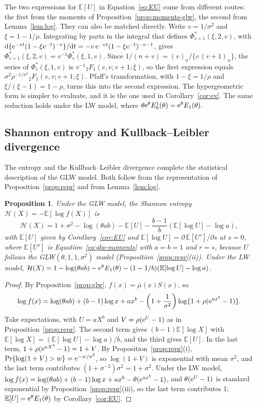 \documentclass[12pt]{article}
\newcommand{\E}{\mathbb{E}}       %
\newcommand{\e}{{\rm e}}         %
\newcommand{\dd}{{\rm d}}        %
\newtheorem{proposition}{Proposition}
\begin{document}
The two expressions for $\E[U]$ in Equation~\eqref{eq:EU} come from different routes: the first from the moments of Proposition~\ref{prop:moments-glw}, the second from Lemma~\ref{lem:log}. They can also be matched directly. Write $v=1/\sigma^2$ and $\xi=1-1/\rho$. Integrating by parts in the integral that defines $\Phi^\ast_{v+1}(\xi,2,v)$, with $\dd\{\e^{-vt}(1-\xi\e^{-t})^{-v}\}/\dd t=-v\,\e^{-vt}(1-\xi\e^{-t})^{-v-1}$, gives $\Phi^\ast_{v+1}(\xi,2,v)=v^{-1}\Phi^\ast_{v}(\xi,1,v)$. Since $1/(n+v)=(v)_n/\{v\,(v+1)_n\}$, the series of $\Phi^\ast_{v}(\xi,1,v)$ is $v^{-1}{}_2F_1(v,v;v+1;\xi)$, so the first expression equals $\sigma^2\rho^{-1/\sigma^2}{}_2F_1(v,v;v+1;\xi)$. Pfaff's transformation, with $1-\xi=1/\rho$ and $\xi/(\xi-1)=1-\rho$, turns this into the second expression. The hypergeometric form is simpler to evaluate, and it is the one used in Corollary~\ref{cor:ex}. The same reduction holds under the LW model, where $\theta\e^\theta E_0^1(\theta)=\e^\theta E_1(\theta)$.

\subsection{Shannon entropy and Kullback--Leibler divergence}\label{app:entropy}

The entropy and the Kullback--Leibler divergence complete the statistical description of the GLW model. Both follow from the representation of Proposition~\ref{prop:repr} and from Lemma~\ref{lem:log}.

\begin{proposition}\label{prop:entropy}
Under the GLW model, the Shannon entropy $\mathcal{H}(X)=-\E[\log f(X)]$ is
\[
\mathcal{H}(X)=1+\sigma^2-\log(\theta ab)-\E[U]-\frac{b-1}{b}\left(\E[\log U]-\log a\right),
\]
with $\E[U]$ given by Corollary~\ref{cor:EU} and $\E[\log U]=\partial\,\E[U^s]/\partial s$ at $s=0$, where $\E[U^s]$ is Equation~\eqref{eq:glw-moments} with $a=b=1$ and $r=s$, because $U$ follows the GLW$(\theta,1,1,\sigma^2)$ model (Proposition~\ref{prop:repr}(ii)). Under the LW model, $\mathcal{H}(X)=1-\log(\theta ab)-\e^\theta E_1(\theta)-(1-1/b)(\E[\log U]-\log a)$.
\end{proposition}

\begin{proof}
By Proposition~\ref{prop:glw}, $f(x)=\bar\mu(x)S(x)$, so
\[
\log f(x)=\log(\theta ab)+(b-1)\log x+ax^b-\left(1+\frac1{\sigma^2}\right)\log\{1+\rho(\e^{ax^b}-1)\}.
\]
Take expectations, with $U=aX^b$ and $V=\rho(\e^U-1)$ as in Proposition~\ref{prop:repr}. The second term gives $(b-1)\E[\log X]$ with $\E[\log X]=(\E[\log U]-\log a)/b$, and the third gives $\E[U]$. In the last term, $1+\rho(\e^{aX^b}-1)=1+V$. By Proposition~\ref{prop:repr}(i), $\Pr\{\log(1+V)>w\}=\e^{-w/\sigma^2}$, so $\log(1+V)$ is exponential with mean $\sigma^2$, and the last term contributes $(1+\sigma^{-2})\sigma^2=1+\sigma^2$. Under the LW model, $\log f(x)=\log(\theta ab)+(b-1)\log x+ax^b-\theta(\e^{ax^b}-1)$, and $\theta(\e^{U}-1)$ is standard exponential by Proposition~\ref{prop:repr}(iii), so the last term contributes 1; $\E[U]=\e^\theta E_1(\theta)$ by Corollary~\ref{cor:EU}.
\end{proof}
\end{document}
